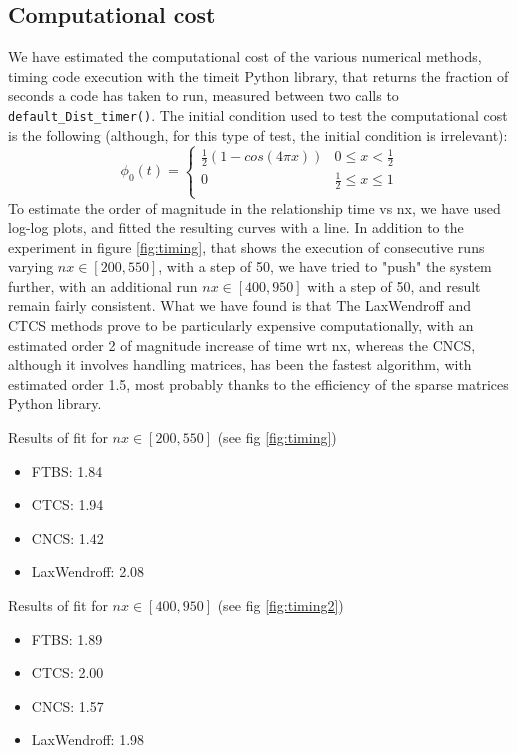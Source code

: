 \subsection{Computational cost}
\label{sec:compcost}
We have estimated the computational cost of the various numerical methods, timing code execution with the timeit Python library, that returns the fraction of seconds a code has taken to run, measured between two calls to \texttt{default\_Dist\_timer()}.
The initial condition used to test the computational cost is the following (although, for this type of test, the initial condition is irrelevant):
\begin{equation}
\phi_0(t)=\left\{
\begin{array}{lr}
\frac{1}{2}(1-cos(4\pi x)) & 0\leq x<\frac{1}{2} \\
0 &  \frac{1}{2}\leq x\leq 1 \\
\end{array}
\right.
\label{eq:initcondcos}
\end{equation}
To estimate the order of magnitude in the relationship time vs nx, we have used log-log plots, and fitted the resulting curves with a line. In addition to the experiment in figure \ref{fig:timing}, that shows the execution of consecutive runs varying $nx\in [200, 550]$, with a step of 50, we have tried to "push" the system further, with an additional run $nx\in [400, 950]$ with a step of 50, and result remain fairly consistent.
What we have found is that The LaxWendroff and CTCS methods prove to be particularly expensive computationally, with an estimated order 2 of magnitude increase of time wrt nx, whereas the CNCS, although it involves handling matrices, has been the fastest algorithm, with estimated order 1.5, most probably thanks to the efficiency of the sparse matrices Python library.

Results of fit for $nx\in [200, 550]$ (see fig \ref{fig:timing})
\begin{itemize}
	\item FTBS: 1.84
	\item CTCS: 1.94
	\item CNCS: 1.42
	\item LaxWendroff: 2.08
\end{itemize}

Results of fit for $nx\in [400, 950]$ (see fig \ref{fig:timing2})
\begin{itemize}
\item FTBS: 1.89
\item CTCS: 2.00
\item CNCS: 1.57
\item LaxWendroff: 1.98
\end{itemize}

